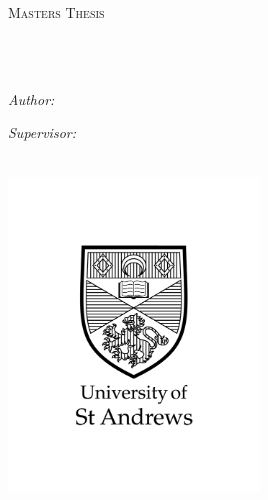 \documentclass[
12pt, %
oneside, %
english, %
singlespacing, %
liststotoc, %
toctotoc, %
headsepline, %
]{MastersDoctoralThesis} %
\author{Carson \textsc{Brown}} %
\begin{document}
\frontmatter %

\pagestyle{plain} %


\begin{titlepage}
\begin{center}

\vspace*{.06\textheight}
{\scshape\LARGE \univname\par}\vspace{1.5cm} %
\textsc{\Large Masters Thesis}\\[0.5cm] %

\HRule \\[0.4cm] %
{\huge \bfseries \ttitle\par}\vspace{0.4cm} %
\HRule \\[1.5cm] %

\begin{minipage}[t]{0.4\textwidth}
\begin{flushleft} \large
\emph{Author:}\\\authorname
\end{flushleft}
\end{minipage}
\begin{minipage}[t]{0.4\textwidth}
\begin{flushright} \large
\emph{Supervisor:}\\\supname
\end{flushright}
\end{minipage}\\[2cm]

\includegraphics[width=0.5\textwidth]{st-andrews_vertical_black.png}\\[1.5cm]


\end{center}
\end{titlepage}
\end{document}

